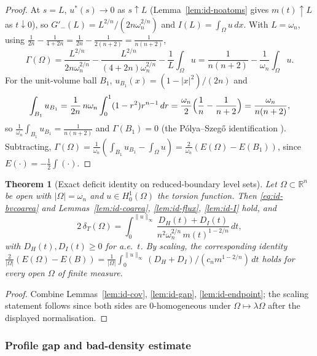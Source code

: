 \documentclass[11pt]{amsart}
\newtheorem{theorem}{Theorem}[section]
\theoremstyle{definition}
\newcommand{\R}{\mathbb R}
\newcommand{\Om}{\Omega}
\newcommand{\dT}{\delta_T}
\begin{document}
\begin{proof}
At \(s=L\), \(u^*(s)\to0\) as \(s\uparrow L\) (Lemma~\ref{lem:id-noatoms} gives
\(m(t)\uparrow L\) as \(t\downarrow0\)), so \(G'_-(L)=L^{2/n}/(2n\omega_n^{2/n})\)
and \(I(L)=\int_\Om u\,dx\).  With \(L=\omega_n\), using
\(\frac{1}{2n}-\frac1{4+2n}=\frac{1}{2n}-\frac1{2(n+2)}=\frac1{n(n+2)}\),
\[
   \Gamma(\Om)
   =\frac{L^{2/n}}{2n\omega_n^{2/n}}-\frac{L^{2/n}}{(4+2n)\omega_n^{2/n}}
    -\frac1L\int_\Om u
   =\frac{1}{n(n+2)}-\frac1{\omega_n}\int_\Om u .
\]
For the unit-volume ball \(B_1\), \(u_{B_1}(x)=(1-|x|^2)/(2n)\) and
\[
   \int_{B_1}u_{B_1}
   =\frac1{2n}\,n\omega_n\int_0^1(1-r^2)r^{n-1}\,dr
   =\frac{\omega_n}{2}\Bigl(\frac1n-\frac1{n+2}\Bigr)
   =\frac{\omega_n}{n(n+2)},
\]
so \(\frac1{\omega_n}\int_{B_1}u_{B_1}=\frac1{n(n+2)}\) and \(\Gamma(B_1)=0\)
(the P\'olya--Szeg\H{o} identification \cite{PolyaSzego1951,Bandle1980}).
Subtracting, \(\Gamma(\Om)=\frac1{\omega_n}(\int_{B_1}u_{B_1}-\int_\Om u)
=\frac{2}{\omega_n}(E(\Om)-E(B_1))\), since \(E(\cdot)=-\tfrac12\int(\cdot)\).
\end{proof}

\begin{theorem}[Exact deficit identity on reduced-boundary level sets]
\label{thm:id-main}
Let \(\Om\subset\R^n\) be open with \(|\Om|=\omega_n\) and \(u\in H^1_0(\Om)\)
the torsion function.  Then \eqref{eq:id-bvcoarea} and
Lemmas~\ref{lem:id-coarea}, \ref{lem:id-flux}, \ref{lem:id-I} hold, and
\begin{equation}\label{eq:id-main}
   \boxed{\;
   2\,\dT(\Om)
   =\int_0^{\|u\|_\infty}
      \frac{D_H(t)+D_I(t)}{n^2\omega_n^{2/n}\,m(t)^{1-2/n}}\,dt ,\;}
\end{equation}
with \(D_H(t),D_I(t)\ge0\) for a.e.\ \(t\).  By scaling, the corresponding
identity \(\tfrac{2}{|\Om|}(E(\Om)-E(B))=\tfrac1{|\Om|}\int_0^{\|u\|_\infty}
(D_H+D_I)/(c_n m^{1-2/n})\,dt\) holds for every open \(\Om\) of finite measure.
\end{theorem}

\begin{proof}
Combine Lemmas~\ref{lem:id-cov}, \ref{lem:id-gap}, \ref{lem:id-endpoint}; the
scaling statement follows since both sides are \(0\)-homogeneous under
\(\Om\mapsto\lambda\Om\) after the displayed normalisation.
\end{proof}

\subsubsection{Profile gap and bad-density estimate}\label{sec:profilegap}
\end{document}
